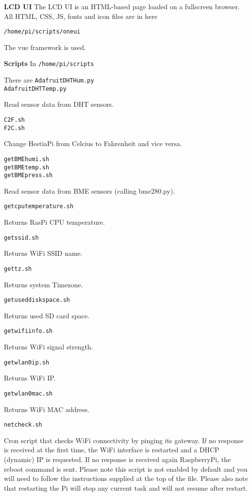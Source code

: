 \textbf{LCD UI}
The LCD UI is an HTML-based page loaded on a fullscreen browser. All HTML, CSS, JS, fonts and icon files are in here

\texttt{/home/pi/scripts/oneui}

The vue framework is used.
    
\textbf{Scripts}
In 
\texttt{/home/pi/scripts}

There are
\texttt{AdafruitDHTHum.py\\
AdafruitDHTTemp.py}

Read sensor data from DHT sensors.

\texttt{C2F.sh\\
F2C.sh}

Change HestiaPi from Celcius to Fahrenheit and vice versa.

\texttt{getBMEhumi.sh\\
getBMEtemp.sh\\
getBMEpress.sh}

Read sensor data from BME sensors (calling bme280.py).

\texttt{getcputemperature.sh}

Returns RasPi CPU temperature.

\texttt{getssid.sh}

Returns WiFi SSID name.

\texttt{gettz.sh}

Returns system Timezone.

\texttt{getuseddiskspace.sh}

Returns used SD card space.

\texttt{getwifiinfo.sh }

Returns WiFi signal strength.

\texttt{getwlan0ip.sh }

Returns WiFi IP.

\texttt{getwlan0mac.sh }

Returns WiFi MAC address.

\texttt{netcheck.sh }

Cron script that checks WiFi connectivity by pinging its gateway. If no
response is received at the first time, the WiFi interface is restarted and a
DHCP (dynamic) IP is requested. If no response is received again RaspberryPi,
the reboot command is sent. Please note this script is not enabled by default
and you will need to follow the instructions supplied at the top of the file.
Please also note that restarting the Pi will stop any current task and will not
resume after restart.

